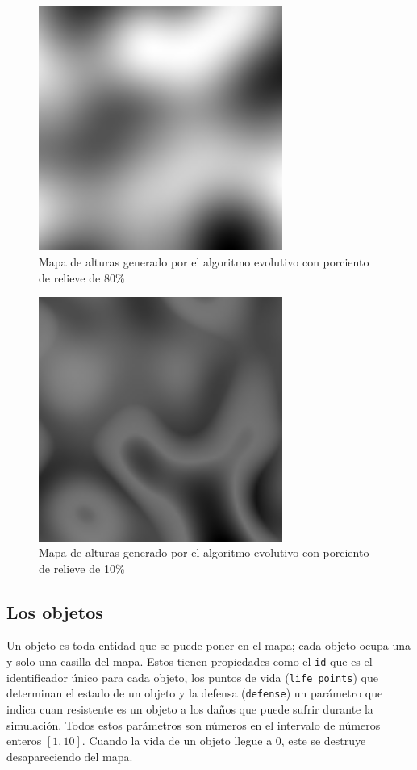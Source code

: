 \begin{figure}
	\centering
	\includegraphics[width=8cm]{chapters/img/map80.png}
	\caption{Mapa de alturas generado por el algoritmo evolutivo con porciento de relieve de 80\%}
\end{figure}

\begin{figure}
	\centering
	\includegraphics[width=8cm]{chapters/img/map10.png}
	\caption{Mapa de alturas generado por el algoritmo evolutivo con porciento de relieve de 10\%}
\end{figure}


\subsection{Los objetos}

Un objeto es toda entidad que se puede poner en el mapa; cada objeto ocupa una y solo una casilla del mapa. Estos tienen propiedades como el \verb|id| que es el identificador único para cada objeto, los puntos de vida (\verb|life_points|) que determinan el estado de un objeto y la defensa (\verb|defense|) un parámetro que indica cuan resistente es un objeto a los daños que puede sufrir durante la simulación. Todos estos parámetros son números en el intervalo de números enteros $[1,10]$. Cuando la vida de un objeto llegue a 0, este se destruye desapareciendo del mapa. 

